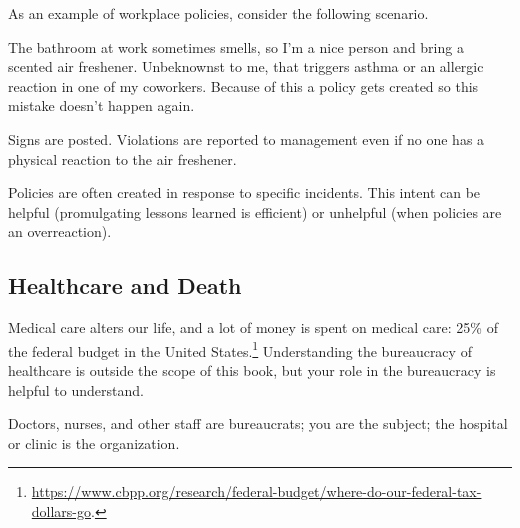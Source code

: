 As an example of workplace policies, consider the following scenario. 
\begin{mdframed}[frametitle={The Bathroom Stinks},frametitlerule=true,frametitlealignment=\centering]
The bathroom at work sometimes smells, so I'm a nice person and bring a scented air freshener. Unbeknownst to me, that triggers asthma or an allergic reaction in one of my coworkers. Because of this a policy gets created so this mistake doesn't happen again. 

Signs are posted. Violations are reported to management even if no one has a physical reaction to the air freshener.
\end{mdframed}

Policies are often created in response to specific incidents. This intent can be helpful (promulgating lessons learned is efficient) or unhelpful (when policies are an overreaction). 

\subsection*{Healthcare and Death\label{sec:bureaucracy-of-death}}
Medical care alters our life, and a lot of money is spent on medical care: 25\% of the federal budget in the United States.\footnote{\href{https://www.cbpp.org/research/federal-budget/where-do-our-federal-tax-dollars-go}{https://www.cbpp.org/research/federal-budget/where-do-our-federal-tax-dollars-go}.} Understanding the bureaucracy of healthcare is outside the scope of this book, but your role in the bureaucracy is helpful to understand.

Doctors, nurses, and other staff are bureaucrats; you are the subject; the hospital or clinic is the organization. 

